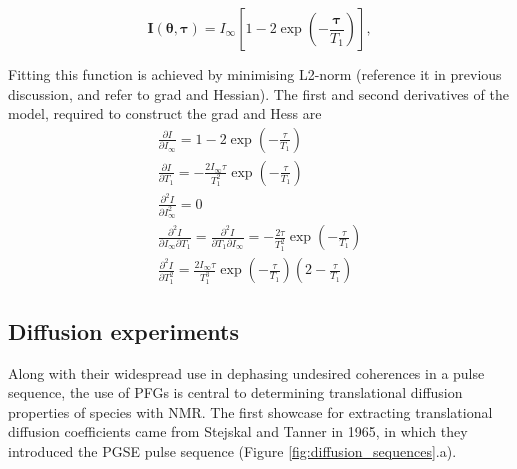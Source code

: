 \begin{equation}
    \symbf{I}\left(\symbf{\theta}, \symbf{\tau}\right) =
        I_{\infty} \left[ 1 - 2 \exp\left( -\frac{\symbf{\tau}}{T_1}\right) \right],
\end{equation}

Fitting this function is achieved by minimising L2-norm (reference it in
previous discussion, and refer to grad and Hessian). The first and second
derivatives of the model, required to construct the grad and Hess are
\begin{subequations}
    \begin{gather}
        \frac{\partial I}{\partial I_{\infty}} =
            1 - 2 \exp \left( -\frac{\tau}{T_1} \right)\\
        \frac{\partial I}{\partial T_1} =
        -\frac{2 I_{\infty} \tau}{T_1^2} \exp\left( -\frac{\tau}{T_1} \right)\\
        \frac{\partial^2 I}{\partial I_{\infty}^2} = 0\\
        \frac{\partial^2 I}{\partial I_{\infty} \partial T_1} =
            \frac{\partial^2 I}{\partial T_1 \partial I_{\infty}} =
            -\frac{2 \tau}{T_1^2} \exp\left(- \frac{\tau}{T_1} \right)\\
        \frac{\partial^2 I}{\partial T_1^2} =
            \frac{2 I_{\infty} \tau}{T_1^3} \exp\left(- \frac{\tau}{T_1} \right)
            \left(2 - \frac{\tau}{T_1}\right)
    \end{gather}
\end{subequations}

\subsection{Diffusion experiments}
\label{sec:diffusion_experiments}

Along with their widespread use in dephasing undesired coherences in a pulse
sequence, the use of \acp{PFG} is central to determining translational
diffusion properties of species with NMR. The first showcase for extracting
translational diffusion coefficients came from Stejskal and Tanner in 1965, in
which they introduced the \ac{PGSE} pulse sequence\cite{Stejskal1965} (Figure
\ref{fig:diffusion_sequences}.a).

